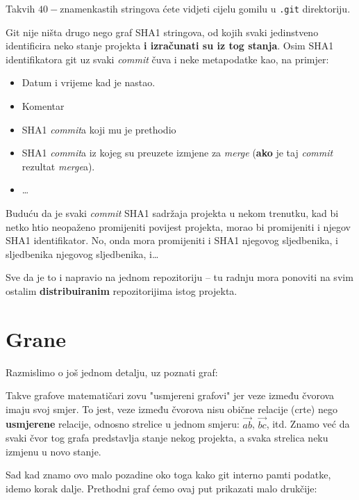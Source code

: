 Takvih $40-$znamenkastih stringova ćete vidjeti cijelu gomilu u \verb+.git+ direktoriju.

Git nije ništa drugo nego graf SHA1 stringova, od kojih svaki jedinstveno identificira neko stanje projekta \textbf{i izračunati su iz tog stanja}.
Osim SHA1 identifikatora git uz svaki \emph{commit} čuva i neke metapodatke kao, na primjer:

\begin{itemize}
	\item Datum i vrijeme kad je nastao.
	\item Komentar
	\item SHA1 \emph{commit}a koji mu je prethodio
	\item SHA1 \emph{commit}a iz kojeg su preuzete izmjene za \emph{merge} (\textbf{ako} je taj \emph{commit} rezultat \emph{merge}a).
	\item \dots
\end{itemize}

Buduću da je svaki \emph{commit} SHA1 sadržaja projekta u nekom trenutku, kad bi netko htio neopaženo promijeniti povijest projekta, morao bi promijeniti i njegov SHA1 identifikator.
No, onda mora promijeniti i SHA1 njegovog sljedbenika, i sljedbenika njegovog sljedbenika, i\dots

Sve da je to i napravio na jednom repozitoriju -- tu radnju mora ponoviti na svim ostalim \textbf{distribuiranim} repozitorijima istog projekta.

\section*{Grane}

Razmislimo o još jednom detalju, uz poznati graf:



Takve grafove matematičari zovu "usmjereni grafovi" jer veze između čvorova imaju svoj smjer.
To jest, veze između čvorova nisu obične relacije (crte) nego \textbf{usmjerene} relacije, odnosno strelice u jednom smjeru: $\vec{ab}$, $\vec{bc}$, itd.
Znamo već da svaki čvor tog grafa predstavlja stanje nekog projekta, a svaka strelica neku izmjenu u novo stanje.

Sad kad znamo ovo malo pozadine oko toga kako git interno pamti podatke, idemo korak dalje.
Prethodni graf ćemo ovaj put prikazati malo drukčije:



